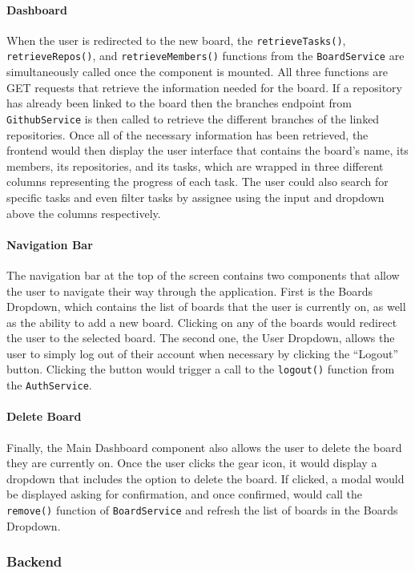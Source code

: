 \documentclass{article}
\def\code#1{\texttt{#1}}
\begin{document}
\paragraph{Dashboard}
When the user is redirected to the new board, the \code{retrieveTasks()},
\code{retrieveRepos()}, and \code{retrieveMembers()} functions from the
\code{BoardService} are simultaneously called once the component is mounted. All
three functions are GET requests that retrieve the information needed for the
board. If a repository has already been linked to the board then the branches
endpoint from \code{GithubService} is then called to retrieve the different
branches of the linked repositories. Once all of the necessary information has
been retrieved, the frontend would then display the user interface that contains
the board’s name, its members, its repositories, and its tasks, which are
wrapped in three different columns representing the progress of each task. The
user could also search for specific tasks and even filter tasks by assignee
using the input and dropdown above the columns respectively.

\paragraph{Navigation Bar}
The navigation bar at the top of the screen contains two components that allow
the user to navigate their way through the application. First is the Boards
Dropdown, which contains the list of boards that the user is currently on, as
well as the ability to add a new board. Clicking on any of the boards would
redirect the user to the selected board. The second one, the User Dropdown,
allows the user to simply log out of their account when necessary by clicking
the “Logout” button. Clicking the button would trigger a call to the \code{logout()}
function from the \code{AuthService}.

\paragraph{Delete Board}
Finally, the Main Dashboard component also allows the user to delete the board
they are currently on. Once the user clicks the gear icon, it would display a
dropdown that includes the option to delete the board. If clicked, a modal would
be displayed asking for confirmation, and once confirmed, would call the
\code{remove()} function of \code{BoardService} and refresh the list of boards in the Boards
Dropdown.

\subsubsection{Backend}
\end{document}
